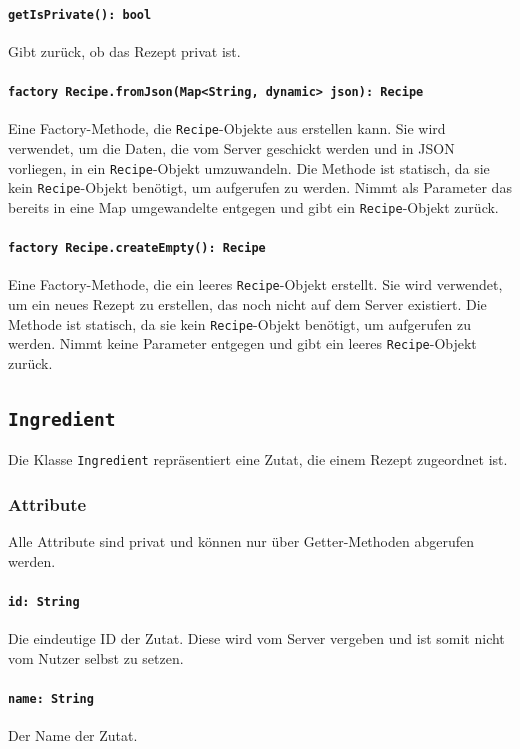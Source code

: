 \documentclass{entwurfsheft}
\begin{document}
\begin{sloppypar}
\paragraph{\texttt{getIsPrivate(): bool}}
Gibt zurück, ob das Rezept privat ist.
\paragraph{\texttt{factory Recipe.fromJson(Map<String, dynamic> json): Recipe}}
Eine Factory-Methode, die \texttt{Recipe}-Objekte aus  erstellen kann. Sie wird verwendet, um die Daten, die vom Server geschickt werden und in \Gls{JSON} vorliegen, in ein \texttt{Recipe}-Objekt umzuwandeln. Die Methode ist statisch, da sie kein \texttt{Recipe}-Objekt benötigt, um aufgerufen zu werden. Nimmt als Parameter das bereits in eine Map umgewandelte  entgegen und gibt ein \texttt{Recipe}-Objekt zurück.
\paragraph{\texttt{factory Recipe.createEmpty(): Recipe}}
Eine Factory-Methode, die ein leeres \texttt{Recipe}-Objekt erstellt. Sie wird verwendet, um ein neues Rezept zu erstellen, das noch nicht auf dem Server existiert. Die Methode ist statisch, da sie kein \texttt{Recipe}-Objekt benötigt, um aufgerufen zu werden. Nimmt keine Parameter entgegen und gibt ein leeres \texttt{Recipe}-Objekt zurück.
\newpage
\subsection{\texttt{Ingredient}}
\label{sec:ingredient}
Die Klasse \texttt{Ingredient} repräsentiert eine Zutat, die einem Rezept zugeordnet ist.
\subsubsection*{Attribute}
Alle Attribute sind privat und können nur über Getter-Methoden abgerufen werden.
\paragraph{\texttt{id: String}}
Die eindeutige ID der Zutat. Diese wird vom Server vergeben und ist somit nicht vom Nutzer selbst zu setzen.
\paragraph{\texttt{name: String}}
Der Name der Zutat.

\end{sloppypar}
\end{document}

